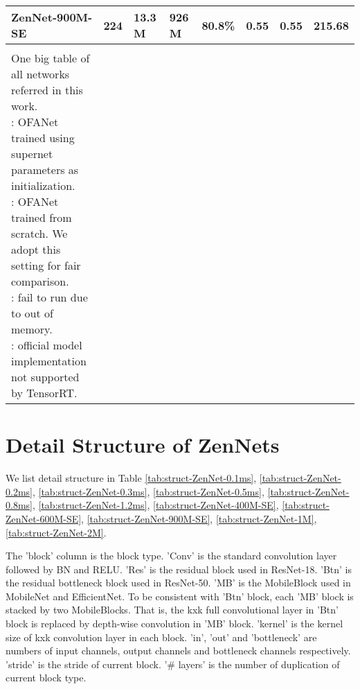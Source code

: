 \documentclass{article}
\providecommand{\tabularnewline}{\\}
\providecommand{\tabularnewline}{\\}
\begin{document}
\begin{longtable}[c]{llllllll}
\midrule 
ZenNet-900M-SE & 224 & 13.3\,M & 926\,M & 80.8\% & 0.55 & 0.55 & 215.68\tabularnewline
\bottomrule \\
  \caption{One big table of all networks referred in this work. \\
  : OFANet trained using supernet parameters as initialization. \\
  : OFANet trained from scratch. We adopt this setting for fair comparison.\\
  : fail to run due to out of memory. \\
  : official model implementation not supported by TensorRT.}
  \label{tab:one-big-table}
\end{longtable}



\clearpage \newpage

\section{Detail Structure of ZenNets}

We list detail structure in Table \ref{tab:struct-ZenNet-0.1ms}, \ref{tab:struct-ZenNet-0.2ms}, \ref{tab:struct-ZenNet-0.3ms}, \ref{tab:struct-ZenNet-0.5ms}, \ref{tab:struct-ZenNet-0.8ms}, \ref{tab:struct-ZenNet-1.2ms}, \ref{tab:struct-ZenNet-400M-SE}, \ref{tab:struct-ZenNet-600M-SE}, \ref{tab:struct-ZenNet-900M-SE}, \ref{tab:struct-ZenNet-1M}, \ref{tab:struct-ZenNet-2M}.

The 'block' column is the block type. 'Conv' is the standard convolution layer followed by BN and RELU. 'Res' is the residual block used in ResNet-18. 'Btn' is the residual bottleneck block used in ResNet-50. 'MB' is the MobileBlock used in MobileNet and EfficientNet. To be consistent with 'Btn' block, each 'MB' block is stacked by two MobileBlocks. That is, the kxk full convolutional layer in 'Btn' block is replaced by depth-wise convolution in 'MB' block. 'kernel' is the kernel size of kxk convolution layer in each block. 'in', 'out' and 'bottleneck' are numbers of input channels, output channels and bottleneck channels respectively. 'stride' is the stride of current block. '\# layers' is the number of duplication of current block type.
\end{document}
